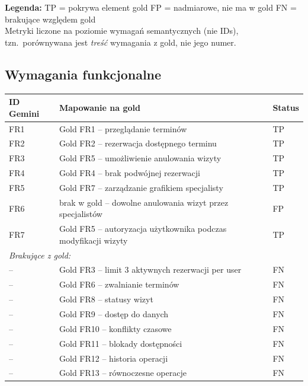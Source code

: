 \documentclass[12pt,a4paper]{article}
\newcommand{\tp}[1]{\colorbox{tpcolor}{\small #1}}
\newcommand{\fp}[1]{\colorbox{fpcolor}{\small #1}}
\newcommand{\fn}[1]{\colorbox{fncolor}{\small #1}}
\begin{document}
\begin{mdframed}[backgroundcolor=metabg, linewidth=0pt, innerleftmargin=10pt, innerrightmargin=10pt, innertopmargin=8pt, innerbottommargin=8pt]
\small
\textbf{Legenda:} \tp{TP} = pokrywa element gold \quad \fp{FP} = nadmiarowe, nie ma w gold \quad \fn{FN} = brakujące względem gold\\[0.3em]
Metryki liczone na poziomie wymagań semantycznych (nie IDs), tzn.\ porównywana jest \textit{treść} wymagania z gold, nie jego numer.
\end{mdframed}

\vspace{0.8em}

\subsection{Wymagania funkcjonalne}

\begin{tabular}{p{2.5cm} p{7cm} l}
\toprule
\textbf{ID Gemini} & \textbf{Mapowanie na gold} & \textbf{Status} \\
\midrule
FR1 & Gold FR1 -- przeglądanie terminów & \tp{TP} \\
FR2 & Gold FR2 -- rezerwacja dostępnego terminu & \tp{TP} \\
FR3 & Gold FR5 -- umożliwienie anulowania wizyty & \tp{TP} \\
FR4 & Gold FR4 -- brak podwójnej rezerwacji & \tp{TP} \\
FR5 & Gold FR7 -- zarządzanie grafikiem specjalisty & \tp{TP} \\
FR6 & brak w gold -- dowolne anulowania wizyt przez specjalistów & \fp{FP} \\
FR7 & Gold FR5 -- autoryzacja użytkownika podczas modyfikacji wizyty & \tp{TP} \\
\midrule
\multicolumn{3}{l}{\textit{Brakujące z gold:}} \\
-- & Gold FR3 -- limit 3 aktywnych rezerwacji per user & \fn{FN} \\
-- & Gold FR6 -- zwalnianie terminów & \fn{FN} \\
-- & Gold FR8 -- statusy wizyt & \fn{FN} \\
-- & Gold FR9 -- dostęp do danych & \fn{FN} \\
-- & Gold FR10 -- konflikty czasowe & \fn{FN} \\
-- & Gold FR11 -- blokady dostępności & \fn{FN} \\
-- & Gold FR12 -- historia operacji & \fn{FN} \\
-- & Gold FR13 -- równoczesne operacje & \fn{FN} \\
\bottomrule
\end{tabular}
\end{document}
